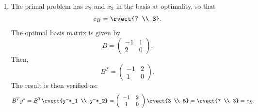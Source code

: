 \begin{enumerate}
\item The primal problem has $x_2$ and $x_3$ in the basis at 
  optimality, so that
  \[
  c_B = \rvect{7 \\ 3}.
  \]
The optimal basis matrix is given by
\[
B=\left(
\begin{array}{rr}
-1&1 \\ 2&0
\end{array} \right).
\]
Then,
\[
B^{T}=\left(\begin{array}{rr}
-1&2 \\ 1&0
\end{array} \right).
\]
The result is then verified as: 
\[
B^Ty^* = B^T\rvect{y^*_1 \\ y^*_2} =\left(
\begin{array}{cc}
-1&2 \\ 1&0
\end{array}
\right)\rvect{3 \\ 5}  = \rvect{7 \\ 3}   =  c_B.
\]
\end{enumerate}

